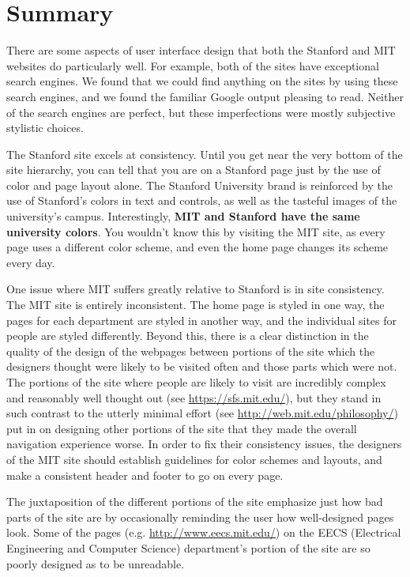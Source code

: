 \section*{Summary}

There are some aspects of user interface design that both the Stanford and MIT
websites do particularly well. For example, both of the sites have exceptional
search engines. We found that we could find anything on the sites by using
these search engines, and we found the familiar Google output pleasing to
read. Neither of the search engines are perfect, but these imperfections were
mostly subjective stylistic choices.

The Stanford site excels at consistency. Until you get near the very bottom of the
site hierarchy, you can tell that you are on a Stanford page just by the use of
color and page layout alone. The Stanford University brand is reinforced by the
use of Stanford's colors in text and controls, as well as the tasteful images
of the university's campus. Interestingly, \textbf{MIT and Stanford have the
same university colors}. You wouldn't know this by visiting the MIT site, as
every page uses a different color scheme, and even the home page changes its
scheme every day.

One issue where MIT suffers greatly relative to Stanford is in site consistency. The MIT site is entirely inconsistent. The
home page is styled in one way, the pages for each department are styled in another way, and the individual sites for people
are styled differently. Beyond this, there is a clear distinction in the quality of the design of the webpages between portions
of the site which the designers thought were likely to be visited often and those parts which were not. The portions of the site
where people are likely to visit are incredibly complex and reasonably well thought out (see \url{https://sfs.mit.edu/}),
but they stand in such contrast to the utterly minimal effort (see \url{http://web.mit.edu/philosophy/}) put in on designing other portions of the site that they made the overall navigation experience worse. In order to fix their consistency
issues, the designers of the MIT site should establish guidelines for color schemes and layouts, and make a consistent header and
footer to go on every page.

The juxtaposition of the different portions of the site emphasize just how bad parts
of the site are by occasionally reminding the user how well-designed pages look. Some of the pages (e.g.
\url{http://www.eecs.mit.edu/}) on the EECS (Electrical Engineering and Computer Science) department's portion of the
site are so poorly designed as to be unreadable.

